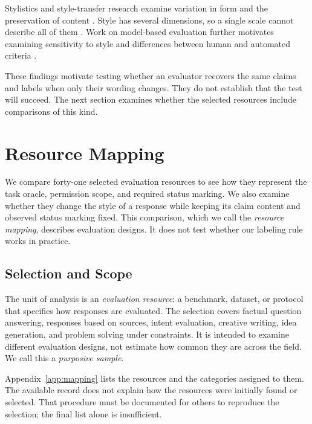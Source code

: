 \documentclass{clv2025}
\begin{document}
Stylistics and style-transfer research examine variation in form and the
preservation of content
\citep{leech_short_style_1981,vanpeer_stylistics_2020,rao_dear_2018,briakou_evaluating_2021}.
Style has several dimensions, so a single scale cannot describe all of them
\citep{kang_style_2021,jin_deep_2022}.
Work on model-based evaluation further motivates examining sensitivity to
style and differences between human and automated criteria
\citep{feuer_style_2025,lyu_converge_2026}.

These findings motivate testing whether an evaluator recovers the same
claims and labels when only their wording changes. They do not establish
that the test will succeed. The next section examines whether the selected
resources include comparisons of this kind.

\section{Resource Mapping}\label{sec:methodology}

We compare forty-one selected evaluation resources to see how they represent
the task oracle, permission scope, and required status marking. We also
examine whether they change the style of a response while keeping its claim
content and observed status marking fixed. This comparison, which we call
the \emph{resource mapping}, describes evaluation designs. It does not test
whether our labeling rule works in practice.

\subsection{Selection and Scope}

The unit of analysis is an \emph{evaluation resource}: a benchmark, dataset,
or protocol that specifies how responses are evaluated. The selection covers
factual question answering, responses based on sources, intent evaluation,
creative writing, idea generation, and problem solving under constraints.
It is intended to examine different evaluation designs, not estimate how
common they are across the field. We call this a \emph{purposive sample}.

Appendix~\ref{app:mapping} lists the resources and the categories assigned to
them. The available record does not explain how the resources were initially
found or selected. That procedure must be documented for others to reproduce
the selection; the final list alone is insufficient.
\end{document}
